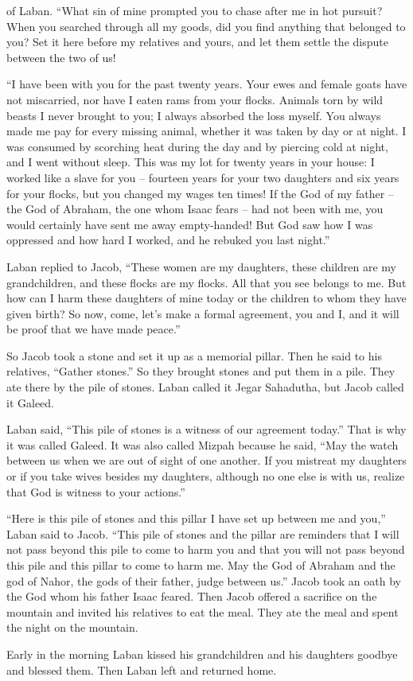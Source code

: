 {of Laban. “What
sin
of mine prompted you to chase
after
me in hot pursuit?
When
you searched
through all
my goods,
did you find
anything
that belonged to you? Set
it here before
my relatives
and yours,
and let them settle the dispute
between
the two of us!
\par }{\PP {}“I
have been with you for the past
twenty
years.
Your ewes
and female goats
have not
miscarried,
nor
have I
eaten
rams
from your flocks.
Animals torn
by wild beasts I never
brought
to
you; I
always absorbed
the loss myself. You always made me pay
for every missing
animal, whether it was taken
by day
or
at night.
I was consumed
by scorching heat
during the day
and by piercing cold
at night,
and I went without sleep.
This
was my lot for twenty
years
in your house: I worked like a slave for you – fourteen years for your two daughters and six years for your flocks, but you changed my wages ten times!
If
the God
of my father
– the God
of Abraham,
the one whom
Isaac
fears –
had not been
with me, you would certainly
have
sent
me away empty-handed! But God
saw
how I was oppressed
and how hard I worked,
and he rebuked
you last night.”
\par }{\PP {}Laban
replied
to
Jacob,
“These women
are my daughters,
these children
are my grandchildren,
and these flocks
are my flocks.
All
that
you
see
belongs to me. But how
can I harm
these
daughters
of mine today
or
the children
to whom
they have given birth?
So now,
come, let’s
make a formal agreement,
you and I,
and it will be
proof that we have made peace.”
\par }{\PP {}So Jacob
took
a stone
and set
it up
as a memorial pillar.
Then he
said
to his relatives,
“Gather
stones.”
So they brought
stones
and put
them in
a pile.
They ate
there
by
the pile of stones.
Laban
called
it Jegar Sahadutha,
but Jacob
called
it Galeed.
\par }{\PP {}Laban
said,
“This
pile
of stones is a witness
of our agreement today.”
That is why
it was called
Galeed.
It was also called Mizpah
because
he said,
“May the
{}
watch
between
us when
we are
out
of sight
of one another.
If
you mistreat
my daughters
or if
you take
wives
besides
my daughters,
although no
one
else is with
us, realize
that God
is witness
to your actions.”
\par }{\PP {}“Here
is this pile
of stones and this
pillar
I have set
up between
me and you,” Laban
said
to Jacob.
“This
pile
of stones
and the pillar
are reminders
that I
will not
pass
beyond
this
pile
to come to harm you and that you
will not
pass
beyond
this
pile
and this
pillar
to come to harm me.
May the God
of Abraham
and the god
of Nahor,
the gods
of their father,
judge
between
us.” Jacob
took an oath
by the God whom his father
Isaac
feared.
Then Jacob
offered
a sacrifice
on the mountain
and invited
his relatives
to eat
the meal.
They ate
the meal
and spent
the night on the mountain.
\par }{\PP {}Early
in the morning
Laban
kissed
his grandchildren
and his daughters
goodbye and blessed
them. Then Laban
left
and returned
home.

}
